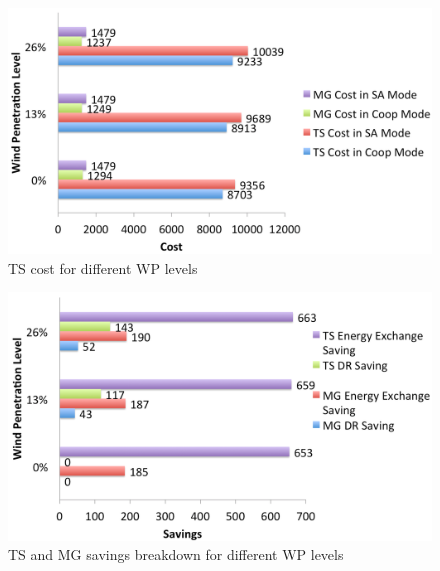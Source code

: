 \begin{figure}[H]
\centering
\includegraphics[scale=0.25]{wp1.png}
\caption{TS cost for different WP levels}
\label{pdsize1}
\end{figure}

\begin{figure}[H]
\centering
\includegraphics[scale=0.25]{wp2.png}
\caption{TS and MG savings breakdown for different WP levels}
\label{pdsize2}
\end{figure}

